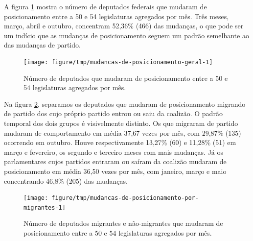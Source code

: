 \documentclass[a4paper,titlepage]{ppgi}\usepackage[]{graphicx}\usepackage[]{color}
\newenvironment{knitrout}{}{} %
\begin{document}
A figura \ref{fig:mudancas-de-posicionamento-geral} mostra o número de
deputados federais que mudaram de posicionamento entre a 50\textordfeminine{} e
54\textordfeminine{} legislaturas agregados por mês. Três meses, março, abril e
outubro, concentram
52,36\%
(466) das mudanças, o que pode
ser um indício que as mudanças de posicionamento seguem um padrão semelhante ao
das mudanças de partido.

\begin{knitrout}
\color{fgcolor}\begin{figure}
\texttt{[image: figure/tmp/mudancas-de-posicionamento-geral-1]} \caption[Número de deputados que mudaram de posicionamento entre a 50\textordfeminine{} e 54\textordfeminine{} legislaturas agregados por mês]{Número de deputados que mudaram de posicionamento entre a 50\textordfeminine{} e 54\textordfeminine{} legislaturas agregados por mês.}\label{fig:mudancas-de-posicionamento-geral}
\end{figure}


\end{knitrout}

Na figura \ref{fig:mudancas-de-posicionamento-por-migrantes}, separamos os
deputados que mudaram de posicionamento migrando de partido dos cujo próprio
partido entrou ou saiu da coalizão. O padrão temporal dos dois grupos é
visivelmente distinto. Os que migraram de partido mudaram de comportamento em
média 37,67 vezes por mês, com
29,87\%
(135) ocorrendo em outubro. Houve respectivamente
13,27\%
(60) e
11,28\%
(51) em março e fevereiro, os segundo e terceiro
meses com mais mudanças. Já os parlamentares cujos partidos entraram ou saíram
da coalizão mudaram de posicionamento em média
36,50 vezes por mês, com janeiro, março e
maio concentrando
46,8\%
(205) das mudanças.

\begin{knitrout}
\color{fgcolor}\begin{figure}
\texttt{[image: figure/tmp/mudancas-de-posicionamento-por-migrantes-1]} \caption[Número de deputados migrantes e não-migrantes que mudaram de posicionamento entre a 50\textordfeminine{} e 54\textordfeminine{} legislaturas agregados por mês]{Número de deputados migrantes e não-migrantes que mudaram de posicionamento entre a 50\textordfeminine{} e 54\textordfeminine{} legislaturas agregados por mês.}\label{fig:mudancas-de-posicionamento-por-migrantes}
\end{figure}


\end{knitrout}
\end{document}
